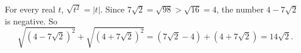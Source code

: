 For every real $t$, $\sqrt{t^2}=|t|$. Since $7\sqrt2=\sqrt{98}>\sqrt{16}=4$, the number $4-7\sqrt2$ is negative. So
\[\sqrt{\left(4-7\sqrt2\right)^2}+\sqrt{\left(4+7\sqrt2\right)^2}=\left(7\sqrt2-4\right)+\left(4+7\sqrt2\right)=\boxed{14\sqrt2}.\]
